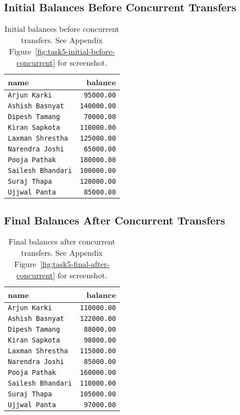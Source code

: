 \subsection{Initial Balances Before Concurrent Transfers}
\begin{table}[H]
  \centering
  \begin{tabular}{|l|r|}
    \hline
    \textbf{name} & \textbf{balance} \\
    \hline
    \texttt{Arjun Karki} & \texttt{95000.00} \\
    \texttt{Ashish Basnyat} & \texttt{140000.00} \\
    \texttt{Dipesh Tamang} & \texttt{70000.00} \\
    \texttt{Kiran Sapkota} & \texttt{110000.00} \\
    \texttt{Laxman Shrestha} & \texttt{125000.00} \\
    \texttt{Narendra Joshi} & \texttt{65000.00} \\
    \texttt{Pooja Pathak} & \texttt{180000.00} \\
    \texttt{Sailesh Bhandari} & \texttt{100000.00} \\
    \texttt{Suraj Thapa} & \texttt{120000.00} \\
    \texttt{Ujjwal Panta} & \texttt{85000.00} \\
    \hline
  \end{tabular}
  \caption{Initial balances before concurrent transfers. See Appendix Figure~\ref{fig:task5-initial-before-concurrent} for screenshot.}
\end{table}

\subsection{Final Balances After Concurrent Transfers}
\begin{table}[H]
  \centering
  \begin{tabular}{|l|r|}
    \hline
    \textbf{name} & \textbf{balance} \\
    \hline
    \texttt{Arjun Karki} & \texttt{110000.00} \\
    \texttt{Ashish Basnyat} & \texttt{122000.00} \\
    \texttt{Dipesh Tamang} & \texttt{88000.00} \\
    \texttt{Kiran Sapkota} & \texttt{98000.00} \\
    \texttt{Laxman Shrestha} & \texttt{115000.00} \\
    \texttt{Narendra Joshi} & \texttt{85000.00} \\
    \texttt{Pooja Pathak} & \texttt{160000.00} \\
    \texttt{Sailesh Bhandari} & \texttt{110000.00} \\
    \texttt{Suraj Thapa} & \texttt{105000.00} \\
    \texttt{Ujjwal Panta} & \texttt{97000.00} \\
    \hline
  \end{tabular}
  \caption{Final balances after concurrent transfers. See Appendix Figure~\ref{fig:task5-final-after-concurrent} for screenshot.}
\end{table}

